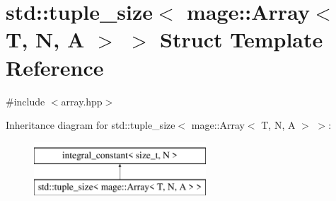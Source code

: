 \hypertarget{structstd_1_1tuple__size_3_01mage_1_1_array_3_01_t_00_01_n_00_01_a_01_4_01_4}{}\section{std\+:\+:tuple\+\_\+size$<$ mage\+:\+:Array$<$ T, N, A $>$ $>$ Struct Template Reference}
\label{structstd_1_1tuple__size_3_01mage_1_1_array_3_01_t_00_01_n_00_01_a_01_4_01_4}


{\ttfamily \#include $<$array.\+hpp$>$}

Inheritance diagram for std\+:\+:tuple\+\_\+size$<$ mage\+:\+:Array$<$ T, N, A $>$ $>$\+:\begin{figure}[H]
\begin{center}
\leavevmode
\includegraphics[height=2.000000cm]{structstd_1_1tuple__size_3_01mage_1_1_array_3_01_t_00_01_n_00_01_a_01_4_01_4}
\end{center}
\end{figure}
